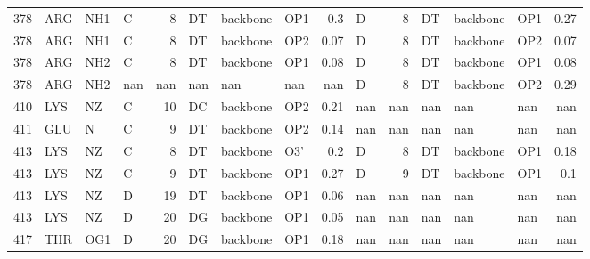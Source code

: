 \begin{longtable}{rlllrlllrlrlllr}
       378 & ARG        & NH1    & C         &           8 & DT           & backbone    & OP1      &          0.3  & D         &           8 & DT           & backbone    & OP1      &          0.27 \\
       378 & ARG        & NH1    & C         &           8 & DT           & backbone    & OP2      &          0.07 & D         &           8 & DT           & backbone    & OP2      &          0.07 \\
       378 & ARG        & NH2    & C         &           8 & DT           & backbone    & OP1      &          0.08 & D         &           8 & DT           & backbone    & OP1      &          0.08 \\
       378 & ARG        & NH2    & nan       &         nan & nan          & nan         & nan      &        nan    & D         &           8 & DT           & backbone    & OP2      &          0.29 \\
       410 & LYS        & NZ     & C         &          10 & DC           & backbone    & OP2      &          0.21 & nan       &         nan & nan          & nan         & nan      &        nan    \\
       411 & GLU        & N      & C         &           9 & DT           & backbone    & OP2      &          0.14 & nan       &         nan & nan          & nan         & nan      &        nan    \\
       413 & LYS        & NZ     & C         &           8 & DT           & backbone    & O3'      &          0.2  & D         &           8 & DT           & backbone    & OP1      &          0.18 \\
       413 & LYS        & NZ     & C         &           9 & DT           & backbone    & OP1      &          0.27 & D         &           9 & DT           & backbone    & OP1      &          0.1  \\
       413 & LYS        & NZ     & D         &          19 & DT           & backbone    & OP1      &          0.06 & nan       &         nan & nan          & nan         & nan      &        nan    \\
       413 & LYS        & NZ     & D         &          20 & DG           & backbone    & OP1      &          0.05 & nan       &         nan & nan          & nan         & nan      &        nan    \\
       417 & THR        & OG1    & D         &          20 & DG           & backbone    & OP1      &          0.18 & nan       &         nan & nan          & nan         & nan      &        nan    \\

\end{longtable}

